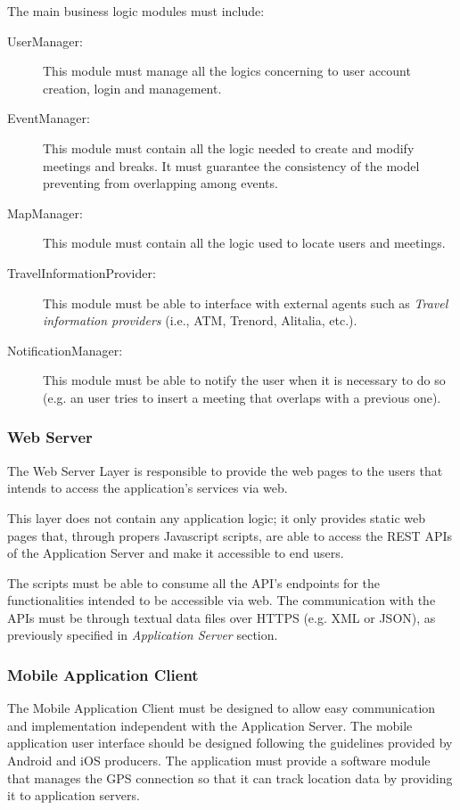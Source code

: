 \documentclass{article}
\begin{document}
	\bigskip
	The main business logic modules must include:

	\begin{description}
	\item [UserManager:] This module must manage all the logics concerning to user account creation, login and management.
	\item [EventManager:] This module must contain all the logic needed to create and modify meetings and breaks. It must guarantee the consistency of the model preventing from overlapping among events. 
	\item [MapManager:] This module must contain all the logic used to locate users and meetings. 
	\item [TravelInformationProvider:] This module must be able to interface with external agents such as \textit{Travel information providers} (i.e., ATM, Trenord, Alitalia, etc.).
	\item [NotificationManager:] This module must be able to notify the user when it is necessary to do so (e.g. an user tries to insert a meeting that overlaps with a previous one).
	\end{description}


	\subsubsection{Web Server}
	The Web Server Layer is responsible to provide the web pages to the users that intends to access the application's services via web.
	
	\bigskip
	This layer does not contain any application logic; it only provides static web pages that, through propers Javascript scripts, are able to access the REST APIs of the Application Server and make it accessible to end users.

	\bigskip
	The scripts must be able to consume all the API's endpoints for the functionalities intended to be accessible via web.
	The communication with the APIs must be through textual data files over HTTPS (e.g. XML or JSON), as previously specified in \textit{Application Server} section.


	\subsubsection{Mobile Application Client}
	The Mobile Application Client must be designed to allow easy communication and implementation independent with the Application Server.
	The mobile application user interface should be designed following the guidelines provided by Android and iOS producers.
	The application must provide a software module that manages the GPS connection so that it can track location data by providing it to application servers.
\end{document}
